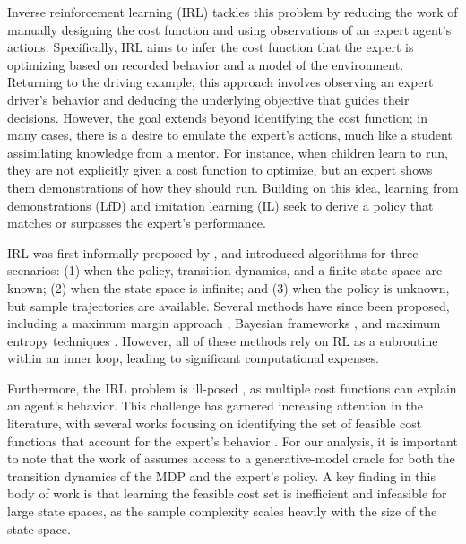 \documentclass[10pt]{article} %
\begin{document}
Inverse reinforcement learning (IRL) tackles this problem by reducing the work of manually designing the cost function and using observations of an expert agent's actions. Specifically, IRL aims to infer the cost function that the expert is optimizing based on recorded behavior and a model of the environment. Returning to the driving example, this approach involves observing an expert driver’s behavior and deducing the underlying objective that guides their decisions. However, the goal extends beyond identifying the cost function; in many cases, there is a desire to emulate the expert's actions, much like a student assimilating knowledge from a mentor. For instance, when children learn to run, they are not explicitly given a cost function to optimize, but an expert shows them demonstrations of how they should run. Building on this idea, learning from demonstrations (LfD) and imitation learning (IL) seek to derive a policy that matches or surpasses the expert's performance.\par

IRL was first informally proposed by  \cite{Russel1998}, and \cite{Ng2000} introduced algorithms for three scenarios: (1) when the policy, transition dynamics, and a finite state space are known; (2) when the state space is infinite; and (3) when the policy is unknown, but sample trajectories are available. Several methods have since been proposed, including a maximum margin approach \citep{Ratliff2006}, Bayesian frameworks \citep{Ramachandran2007}, and maximum entropy techniques \citep{Ziebart2008}. However, all of these methods rely on RL as a subroutine within an inner loop, leading to significant computational expenses. \par

Furthermore, the IRL problem is ill-posed \citep{Ng2000}, as multiple cost functions can explain an agent's behavior. This challenge has garnered increasing attention in the literature, with several works focusing on identifying the set of feasible cost functions that account for the expert's behavior \citep{Metelli2021, Lindner2022}. For our analysis, it is important to note that the work of \cite{Metelli2021, Metelli2023, Lazzati2025} assumes access to a generative-model oracle for both the transition dynamics of the MDP and the expert's policy. A key finding in this body of work is that learning the feasible cost set is inefficient and infeasible for large state spaces, as the sample complexity scales heavily with the size of the state space. \par
\end{document}
